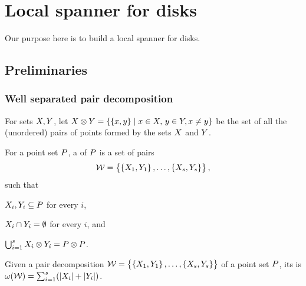 \documentclass[12pt]{article}%
\begin{document}
	
	
\section{Local spanner for disks}
Our purpose here is to build a local spanner for disks.

\subsection{Preliminaries}

\subsubsection{Well separated pair decomposition}

For sets $X, Y$, let
\begin{math}
    \PSX \otimes \PSY%
    =%
    \Set{\brc{\px,\py}}{ \px\in \PSX,\, \py\in \PSY, \px \ne \py }
\end{math}
be the set of all the (unordered) pairs of points formed by the sets
$X$ and $Y$.

\begin{defn}
    For a point set $P$, a  of $P$ is a set of pairs
    \begin{equation*}
        \mathcal{W} = \left\{ {\bigl. \left\{ {X_1,Y_1} \right\},\ldots,\left\{ {X_s,Y_s} \right\}} \right\},
    \end{equation*}
    such that
    \begin{enumerate*}[label=(\Roman*)]
        \item $X_i,Y_i\subseteq P$ for every $i$,
        \item $X_i \cap Y_i = \emptyset$ for every $i$, and
        \item
        $\bigcup_{i=1}^s X_i \otimes Y_i = P \otimes P$.
    \end{enumerate*}
\end{defn}

\begin{defn}
    Given a pair decomposition
    $\mathcal{W} = \left\{ {\bigl. \left\{ {X_1,Y_1} \right\},\ldots,\left\{ {X_s,
          Y_s} \right\}} \right\}$ of a point set $P$, its  is
    $\WeightX{\WS} = \sum_{i=1}^s \pth{ \cardin{\PSX_i } +
       \cardin{\PSY_i}}$.
\end{defn}
\end{document}
